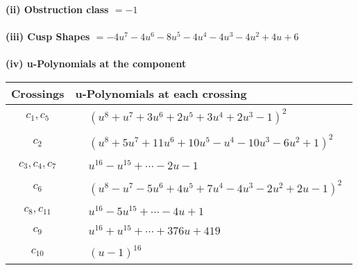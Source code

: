 \documentclass[1p]{elsarticle_modified}
\theoremstyle{definition}
\begin{document}
\flushleft \textbf{(ii) Obstruction class $= -1$}\\~\\
\flushleft \textbf{(iii) Cusp Shapes $= -4 u^7-4 u^6-8 u^5-4 u^4-4 u^3-4 u^2+4 u+6$}\\~\\
\newpage\renewcommand{\arraystretch}{1}
\flushleft \textbf{(iv) u-Polynomials at the component}\newline \\
\begin{tabular}{m{50pt}|m{274pt}}
Crossings & \hspace{64pt}u-Polynomials at each crossing \\
\hline $$\begin{aligned}c_{1},c_{5}\end{aligned}$$&$\begin{aligned}
&(u^8+u^7+3 u^6+2 u^5+3 u^4+2 u^3-1)^2
\end{aligned}$\\
\hline $$\begin{aligned}c_{2}\end{aligned}$$&$\begin{aligned}
&(u^8+5 u^7+11 u^6+10 u^5- u^4-10 u^3-6 u^2+1)^2
\end{aligned}$\\
\hline $$\begin{aligned}c_{3},c_{4},c_{7}\end{aligned}$$&$\begin{aligned}
&u^{16}- u^{15}+\cdots-2 u-1
\end{aligned}$\\
\hline $$\begin{aligned}c_{6}\end{aligned}$$&$\begin{aligned}
&(u^8- u^7-5 u^6+4 u^5+7 u^4-4 u^3-2 u^2+2 u-1)^2
\end{aligned}$\\
\hline $$\begin{aligned}c_{8},c_{11}\end{aligned}$$&$\begin{aligned}
&u^{16}-5 u^{15}+\cdots-4 u+1
\end{aligned}$\\
\hline $$\begin{aligned}c_{9}\end{aligned}$$&$\begin{aligned}
&u^{16}+u^{15}+\cdots+376 u+419
\end{aligned}$\\
\hline $$\begin{aligned}c_{10}\end{aligned}$$&$\begin{aligned}
&(u-1)^{16}
\end{aligned}$\\
\hline
\end{tabular}\\~\\
\end{document}
